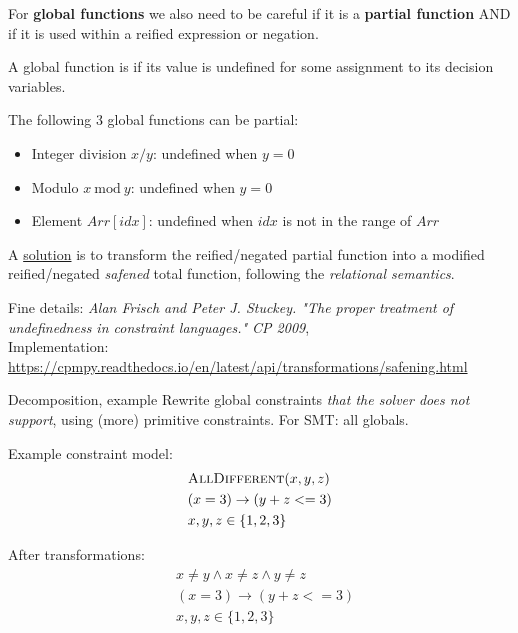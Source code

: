 \documentclass{cons-beamer}
\begin{document}
\begin{frame}%
	
	For \textbf{global functions} we also need to be careful if it is a \textbf{partial function} AND if it is used within a reified expression or negation.
	\vfill
	
	A global function is  if its value is undefined for some assignment to its decision variables.
	
	The following 3 global functions can be partial:
	\begin{itemize}
		\item Integer division $x / y$: undefined when $y=0$
		\item Modulo $x ~\text{mod}~ y$: undefined when $y=0$
		\item Element $Arr[idx]$: undefined when $idx$ is not in the range of $Arr$
	\end{itemize}
	\vfill
	\pause
	
	A \underline{solution} is to transform the reified/negated partial function into a modified reified/negated \textit{safened} total function, following the \textit{relational semantics}.
	\vfill
	
	Fine details: \textit{\footnotesize Alan Frisch and Peter J. Stuckey. "The proper treatment of undefinedness in constraint languages." CP 2009}, \\
	Implementation: {\tiny \url{https://cpmpy.readthedocs.io/en/latest/api/transformations/safening.html}}
\end{frame}

\begin{frame}{Decomposition, example}
	Rewrite global constraints \textit{that the solver does not support}, using (more) primitive constraints. For SMT: all globals.
	\vfill
	
	Example constraint model:
	\begin{align*}
		&\textsc{AllDifferent}(x,y,z) \\
		&(x = 3) \rightarrow (y + z <= 3) \\
		&x,y,z \in \{1,2,3\}
	\end{align*}
	\vfill
	
	After transformations:
	\begin{align*}
		&x \neq y \land x \neq z \land y \neq z \\
		&(x = 3) \rightarrow (y + z <= 3) \\
		&x,y,z \in \{1,2,3\}
	\end{align*}
\end{frame}
\end{document}
